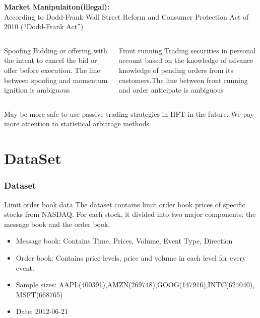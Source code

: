 \documentclass[xcolor={x11names,svgnames,dvipsnames}]{beamer}
\begin{document}
\begin{frame}

\textbf{\large{Market Manipulaiton(illegal):}}\\

\vspace{1cm}
According to Dodd-Frank Wall Street Reform and Consumer Protection Act of 2010
(“Dodd-Frank Act”) 
\begin{columns}
\column{2.4in}

\begin{block}{Spoofing}
\small{Bidding or offering with the intent to
cancel the bid or offer before execution. \alert{The line between spoofing and momentum ignition is ambiguous}}
\end{block}

\column{2.5in}
\begin{block}{Front running}
\small{Trading
securities in personal account based on the knowledge of advance knowledge of pending orders
from its customers.\alert{The line between front running and order anticipate is ambiguous}}
\end{block}

\end{columns}

\vspace{1cm}
May be more \alert{safe} to use passive trading strategies in HFT in the future. We pay more attention to statistical arbitrage methods.

\end{frame}

\section{DataSet}
\begin{frame}
\frametitle{Dataset}
\begin{block}{Limit order book data}
The dataset contains limit order book prices of specific stocks from NASDAQ. For each stock, it divided into two major components: the\alert{ message book} and the \alert{order book}.\\
\begin{itemize}
\item Message book: Contains Time, Prices, Volume, Event Type, Direction

\item Order book: Contains price levels, price and volume in each level for every event.  	

\item Sample sizes: AAPL(400391),AMZN(269748),GOOG(147916),INTC(624040),
MSFT(668765)
\item Date: 2012-06-21
\end{itemize}

\end{block} 

\end{frame}
\end{document}
